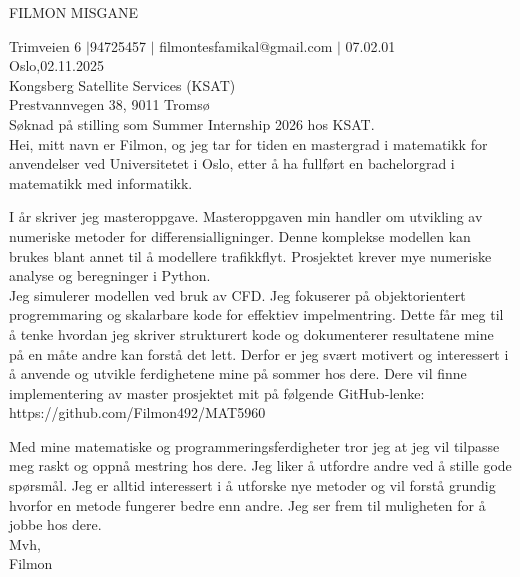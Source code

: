 \documentclass[a4paper,12pt]{letter}
\begin{document}
\begin{letter}{}
    FILMON MISGANE

    Trimveien 6 $\mid$94725457 $\mid$ filmontesfamikal@gmail.com $\mid$ 07.02.01 \\
    Oslo,02.11.2025 \\[0.1in]

    Kongsberg Satellite Services (KSAT) \\
    Prestvannvegen 38, 9011 Tromsø\\[0.1in]

    Søknad på stilling som Summer Internship 2026 hos KSAT. \\

    Hei, mitt navn er Filmon, og jeg tar for tiden en mastergrad i matematikk for anvendelser ved Universitetet i Oslo, etter å ha fullført en bachelorgrad i matematikk med informatikk.

    I år skriver jeg masteroppgave. Masteroppgaven min handler om utvikling av numeriske metoder for differensialligninger. Denne komplekse modellen kan brukes blant annet til å modellere trafikkflyt. Prosjektet krever mye numeriske analyse og beregninger i Python. \\

    Jeg simulerer modellen ved bruk av CFD. Jeg fokuserer på objektorientert progremmaring og skalarbare kode for effektiev impelmentring. Dette får meg til å tenke hvordan jeg skriver strukturert kode og dokumenterer resultatene mine på en måte andre kan forstå det lett. Derfor er jeg svært motivert og interessert i å anvende og utvikle ferdighetene mine på sommer hos dere.
    Dere vil finne implementering av master prosjektet mit på følgende GitHub-lenke:\\
    https://github.com/Filmon492/MAT5960




    Med mine matematiske og programmeringsferdigheter tror jeg at jeg vil tilpasse meg raskt og oppnå mestring hos dere. Jeg liker å utfordre andre ved å stille gode spørsmål. Jeg er alltid interessert i å utforske nye metoder og vil forstå grundig hvorfor en metode fungerer bedre enn andre. Jeg ser frem til muligheten for å jobbe hos dere.\\[0.2in]
    Mvh,\\
    Filmon


\end{letter}
\end{document}
